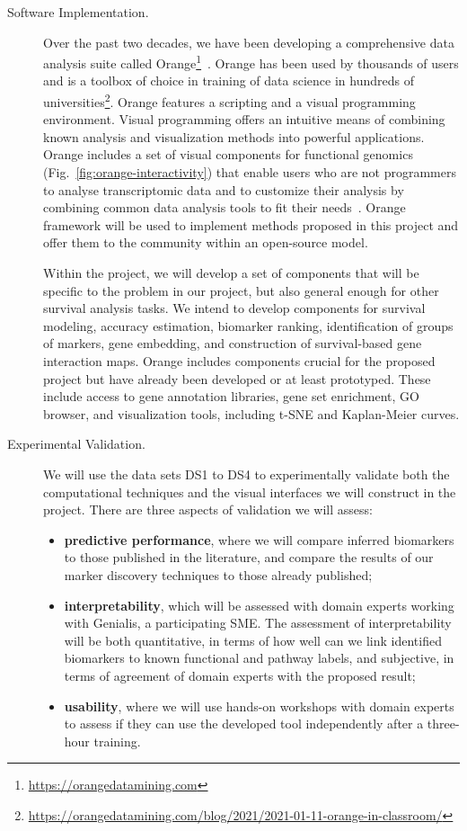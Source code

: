 \documentclass[11pt,a4paper]{article}
\newcommand{\myurl}[1]{\footnote{\url{#1}}}
\renewcommand{\bold}{\textbf}
\begin{document}
\begin{description}
	\item[Software Implementation.] Over the past two decades, we have been developing a comprehensive data analysis suite called Orange\myurl{https://orangedatamining.com}~\cite{Demsar2013,Curk2005,Godec2019}. Orange has been used by thousands of users and is a toolbox of choice in training of data science in hundreds of universities\myurl{https://orangedatamining.com/blog/2021/2021-01-11-orange-in-classroom/}. Orange features a scripting and a visual programming environment. Visual programming offers an intuitive means of combining known analysis and visualization methods into powerful applications. Orange includes a set of visual components for functional genomics (Fig.~\ref{fig:orange-interactivity}) that enable users who are not programmers to analyse transcriptomic data and to customize their analysis by combining common data analysis tools to fit their needs~\cite{Godec2019}. Orange framework will be used to implement methods proposed in this project and offer them to the community within an open-source model.

	Within the project, we will develop a set of components that will be specific to the problem in our project, but also general enough for other survival analysis tasks. We intend to develop components for survival modeling, accuracy estimation, biomarker ranking, identification of groups of markers, gene embedding, and construction of survival-based gene interaction maps. Orange includes components crucial for the proposed project but have already been developed or at least prototyped. These include access to gene annotation libraries, gene set enrichment, GO browser, and visualization tools, including t-SNE and Kaplan-Meier curves.

	\item[Experimental Validation.] We will use the data sets DS1 to DS4 to experimentally validate both the computational techniques and the visual interfaces we will construct in the project. There are three aspects of validation we will assess:
	\begin{itemize}
		\item \bold{predictive performance}, where we will compare inferred biomarkers to those published in the literature, and compare the results of our marker discovery techniques to those already published;
		\item \bold{interpretability}, which will be assessed with domain experts working with Genialis, a participating SME. The assessment of interpretability will be both quantitative, in terms of how well can we link identified biomarkers to known functional and pathway labels, and subjective, in terms of agreement of domain experts with the proposed result;
		\item \bold{usability}, where we will use hands-on workshops with domain experts to assess if they can use the developed tool independently after a three-hour training.
	\end{itemize}
\end{description}
\end{document}
